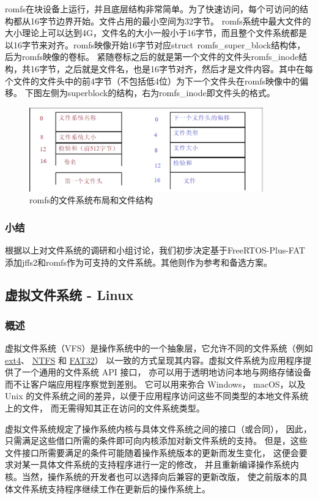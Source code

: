 \documentclass[UTF8,a4paper]{ctexart}
\begin{document}
romfs在块设备上运行，并且底层结构非常简单。为了快速访问，每个可访问的结构都从16字节边界开始。文件占用的最小空间为32字节。
romfs系统中最大文件的大小理论上可以达到4G，文件名的大小一般小于16字节，而且整个文件系统都是以16字节来对齐。romfs映像开始16字节对应struct\ romfs\_super\_block结构体，后为romfs映像的卷标。
紧随卷标之后的就是第一个文件的文件头romfs\_inode结构，共16字节，之后就是文件名，也是16字节对齐，然后才是文件内容。其中在每个文件的文件头中的前4字节（不包括低4位）为下一个文件头在romfs映像中的偏移。
下图左侧为superblock的结构，右为romfs\_inode即文件头的格式。
	\begin{figure}[H]
		\centering
		\includegraphics[width=0.9\textwidth]{romfs.png}
		\caption{romfs的文件系统布局和文件结构}
	\end{figure}
\subsubsection{小结}
根据以上对文件系统的调研和小组讨论，我们初步决定基于FreeRTOS-Plus-FAT添加jffs2和romfs作为可支持的文件系统。其他则作为参考和备选方案。

\subsection{虚拟文件系统 - Linux}
\subsubsection{概述}

虚拟文件系统（VFS）是操作系统中的一个抽象层，它允许不同的文件系统（例如
\href{https://en.wikipedia.org/wiki/Ext4}{ext4}、
\href{https://en.wikipedia.org/wiki/NTFS}{NTFS}
和
\href{https://en.wikipedia.org/wiki/File_Allocation_Table}{FAT32}）
以一致的方式呈现其内容。虚拟文件系统为应用程序提供了一个通用的文件系统
API
接口，
亦可以用于透明地访问本地与网络存储设备而不让客户端应用程序察觉到差别。
它可以用来弥合
Windows， macOS，以及 Unix
的文件系统之间的差异，以便于应用程序访问这些不同类型的本地文件系统上的文件，
而无需得知其正在访问的文件系统类型。

虚拟文件系统规定了操作系统内核与具体文件系统之间的接口（或合同），
因此，只需满足这些借口所需的条件即可向内核添加对新文件系统的支持。
但是，这些文件接口所需要满足的条件可能随着操作系统版本的更新而发生变化，
这便会要求对某一具体文件系统的支持程序进行一定的修改，
并且重新编译操作系统内核。当然，操作系统的开发者也可以选择向后兼容的更新改版，
使之前版本的具体文件系统支持程序继续工作在更新后的操作系统上。
\end{document}
